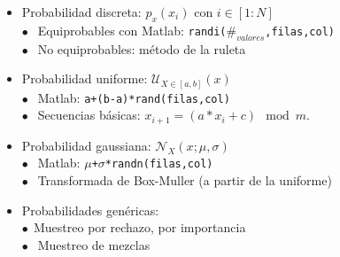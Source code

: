 \begin{frame}
\begin{itemize}
\begin{itemize}
    \begin{itemize}\scriptsize
      \item Probabilidad \alert{discreta}: \color{blue}$p_x(x_i)$ con $i\in [1:N]$\color{black}\\\scriptsize
      \color{blue}$\bullet\:\:$\color{black} Equiprobables con Matlab: \color{blue}\texttt{randi($\#_{valores}$,filas,col)}\color{black}\\
      \color{blue}$\bullet\:\:$\color{black} No equiprobables: método de la ruleta
      \item Probabilidad \alert{uniforme}: \color{blue}$\mathcal{U}_{X\in [a,b]}(x)$\color{black}\\\scriptsize
      \color{blue}$\bullet\:\:$\color{black} Matlab: \color{blue}\texttt{a+(b-a)*rand(filas,col)}\color{black}\\
      \color{blue}$\bullet\:\:$\color{black} Secuencias básicas: $x_{i+1}=(a*x_i+c)\mod m$.
      \hspace{3.2cm}\color{black}
      \item Probabilidad \alert{gaussiana}: \color{blue}$\mathcal{N}_{X}(x;\mu,\sigma)$\color{black}\\\scriptsize
      \color{blue}$\bullet\:\:$\color{black} Matlab: \color{blue}\texttt{$\mu$+$\sigma$*randn(filas,col)}\color{black}\\
      \color{blue}$\bullet\:\:$\color{black} Transformada de Box-Muller (a partir de la uniforme)
      \item Probabilidades \alert{genéricas}:\\\scriptsize
      \color{blue}$\bullet\:\:$\color{black}Muestreo por rechazo, por importancia\\
      \color{blue}$\bullet\:\:$\color{black} Muestreo de mezclas
    \end{itemize}
    \end{itemize}
  \end{itemize}
\end{frame}

